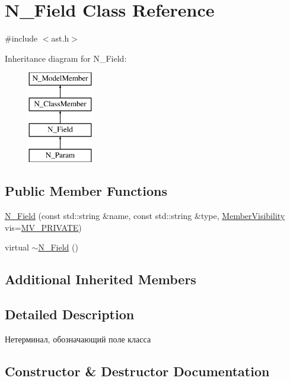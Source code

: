 \hypertarget{classN__Field}{}\section{N\+\_\+\+Field Class Reference}
\label{classN__Field}


{\ttfamily \#include $<$ast.\+h$>$}

Inheritance diagram for N\+\_\+\+Field\+:\begin{figure}[H]
\begin{center}
\leavevmode
\includegraphics[height=4.000000cm]{classN__Field}
\end{center}
\end{figure}
\subsection*{Public Member Functions}
\begin{DoxyCompactItemize}
\item 
\hyperlink{classN__Field_a75e5ec7ff954a3529102a19c034977c6}{N\+\_\+\+Field} (const std\+::string \&name, const std\+::string \&type, \hyperlink{ast_8h_a8cf536792064de0e4fc620bc6f1dc90e}{Member\+Visibility} vis=\hyperlink{ast_8h_a8cf536792064de0e4fc620bc6f1dc90eae560d950ff759756c70399d8cfe015d0}{M\+V\+\_\+\+P\+R\+I\+V\+A\+T\+E})
\item 
virtual \hyperlink{classN__Field_af4633db19c3c931497cdc3ac98ff772b}{$\sim$\+N\+\_\+\+Field} ()
\end{DoxyCompactItemize}
\subsection*{Additional Inherited Members}


\subsection{Detailed Description}
Нетерминал, обозначающий поле класса 

\subsection{Constructor \& Destructor Documentation}
\hypertarget{classN__Field_a75e5ec7ff954a3529102a19c034977c6}{}
